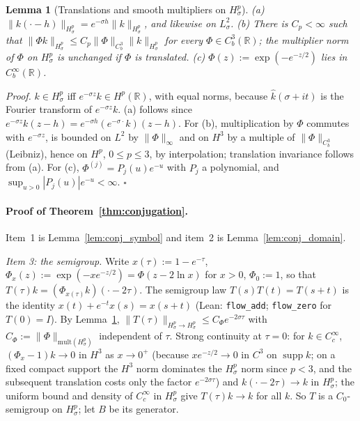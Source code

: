 \documentclass[11pt,a4paper]{article}
\newtheorem{lem}{Lemma}[section]
\begin{document}
\begin{lem}[Translations and smooth multipliers on $H^p_\sigma$]\label{lem:conj_mult}
(a) $\|k(\cdot-h)\|_{H^p_\sigma}=e^{-\sigma h}\|k\|_{H^p_\sigma}$, and likewise on $L^2_\sigma$.
(b) There is $C_p<\infty$ such that $\|\Phi k\|_{H^p_\sigma}\le C_p\|\Phi\|_{C^3_b}\|k\|_{H^p_\sigma}$ for every $\Phi\in C^3_b(\mathbb{R})$;
the multiplier norm of $\Phi$ on $H^p_\sigma$ is unchanged if $\Phi$ is translated.
(c) $\Phi(z):=\exp(-e^{-z/2})$ lies in $C_b^\infty(\mathbb{R})$.
\end{lem}
\textit{Proof.}
$k\in H^p_\sigma$ iff $e^{-\sigma z}k\in H^p(\mathbb{R})$, with equal norms, because $\widehat{k}(\sigma+it)$ is the Fourier transform of
$e^{-\sigma z}k$.  (a) follows since $e^{-\sigma z}k(z-h)=e^{-\sigma h}(e^{-\sigma\cdot}k)(z-h)$.  For (b), multiplication by $\Phi$
commutes with $e^{-\sigma z}$, is bounded on $L^2$ by $\|\Phi\|_\infty$ and on $H^3$ by a multiple of $\|\Phi\|_{C^3_b}$ (Leibniz),
hence on $H^p$, $0\le p\le3$, by interpolation; translation invariance follows from (a).  For (c),
$\Phi^{(j)}=P_j(u)e^{-u}$ with $P_j$ a polynomial, and $\sup_{u>0}|P_j(u)|e^{-u}<\infty$. \hfill$\square$

\paragraph{Proof of Theorem~\ref{thm:conjugation}.}
Item~1 is Lemma~\ref{lem:conj_symbol} and item~2 is Lemma~\ref{lem:conj_domain}.

\emph{Item 3: the semigroup.}  Write $x(\tau):=1-e^{-\tau}$, $\Phi_x(z):=\exp(-xe^{-z/2})=\Phi(z-2\ln x)$ for $x>0$, $\Phi_0:=1$,
so that $T(\tau)k=(\Phi_{x(\tau)}k)(\cdot-2\tau)$.
The semigroup law $T(s)T(t)=T(s+t)$ is the identity $x(t)+e^{-t}x(s)=x(s+t)$ (Lean: \texttt{flow\_add}; \texttt{flow\_zero} for $T(0)=I$).
By Lemma~\ref{lem:conj_mult}, $\|T(\tau)\|_{H^p_\sigma\to H^p_\sigma}\le C_\Phi e^{-2\sigma\tau}$ with
$C_\Phi:=\|\Phi\|_{\mathrm{mult}(H^p_\sigma)}$ independent of $\tau$.
Strong continuity at $\tau=0$: for $k\in C_c^\infty$, $(\Phi_{x}-1)k\to0$ in $H^3$ as $x\to0^+$ (because $xe^{-z/2}\to0$ in
$C^3$ on $\operatorname{supp}k$; on a fixed compact support the $H^3$ norm dominates the $H^p_\sigma$ norm since $p<3$, and the
subsequent translation costs only the factor $e^{-2\sigma\tau}$) and $k(\cdot-2\tau)\to k$ in $H^p_\sigma$; the uniform bound and density of $C_c^\infty$ in
$H^p_\sigma$ give $T(\tau)k\to k$ for all $k$.  So $T$ is a $C_0$-semigroup on $H^p_\sigma$; let $B$ be its generator.
\end{document}
